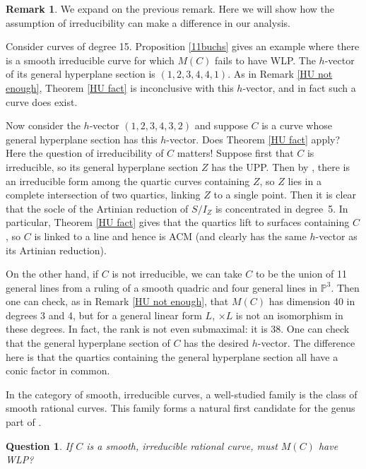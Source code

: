 \documentclass[12pt]{amsart}%
\numberwithin{equation}{section}
\newtheorem{question}[theorem]{Question}
\theoremstyle{definition}
\newtheorem{remark}[theorem]{Remark}
\numberwithin{equation}{section}
\begin{document}
\begin{remark} \label{use irred}
    We expand on the previous remark. Here we will show how the assumption of irreducibility can make a difference in our analysis.
    
    Consider curves of degree 15. Proposition \ref{11buchs} gives an example where there is a smooth irreducible curve for which $M(C)$ fails to have WLP. The $h$-vector of its general hyperplane section is $(1,2,3,4,4,1)$. As in Remark \ref{HU not enough}, Theorem \ref{HU fact} is inconclusive with this $h$-vector, and in fact such a curve does exist.

    Now consider the $h$-vector $(1,2,3,4,3,2)$ and suppose $C$ is a curve whose general hyperplane section has this $h$-vector. Does Theorem \ref{HU fact} apply? Here the question of irreducibility of $C$ matters! Suppose first that $C$ is irreducible, so its general hyperplane section $Z$ has the UPP. Then by \cite[Remark 1.2]{MR}, there is an irreducible form among the quartic curves containing $Z$, so $Z$ lies in a complete intersection of two quartics, linking $Z$ to  a single point. Then it is clear that the socle of the Artinian reduction of $S/I_Z$ is concentrated in degree~5. In particular, Theorem \ref{HU fact} gives that the quartics lift to surfaces containing $C$, so $C$ is linked to a line and hence is ACM (and clearly has the same $h$-vector as its Artinian reduction).

    On the other hand, if $C$ is not irreducible, we can take $C$ to be the union of 11 general lines from a ruling of a smooth quadric and four general lines in $\mathbb P^3$. Then one can check, as in Remark \ref{HU not enough}, that $M(C)$ has dimension 40 in degrees 3 and 4, but for a general linear form $L$, $\times L$ is not an isomorphism in these degrees. In fact, the rank is not even submaximal: it is 38. One can check that the general hyperplane section of $C$ has the desired $h$-vector. The difference here is that the quartics containing the general hyperplane section all have a conic factor in common.
\end{remark}








   In the category of smooth, irreducible curves,
   a well-studied family 
   is the class of smooth rational curves.
   This family forms a natural first candidate for the genus part of .

   \begin{question}
       If $C$ is a smooth, irreducible rational curve, must $M(C)$ have WLP?
   \end{question}
\end{document}
